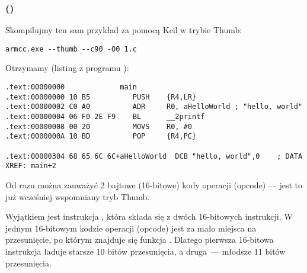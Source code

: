 \subsubsection{\NonOptimizingKeilVI (\ThumbMode)}

Skompilujmy ten sam przykład za pomocą Keil w trybie
 Thumb:

\begin{lstlisting}
armcc.exe --thumb --c90 -O0 1.c 
\end{lstlisting}

Otrzymamy (listing z programu \IDA):

\begin{lstlisting}[caption=\NonOptimizingKeilVI (\ThumbMode) + \IDA,style=customasmARM]
.text:00000000             main
.text:00000000 10 B5          PUSH    {R4,LR}
.text:00000002 C0 A0          ADR     R0, aHelloWorld ; "hello, world"
.text:00000004 06 F0 2E F9    BL      __2printf
.text:00000008 00 20          MOVS    R0, #0
.text:0000000A 10 BD          POP     {R4,PC}

.text:00000304 68 65 6C 6C+aHelloWorld  DCB "hello, world",0    ; DATA XREF: main+2
\end{lstlisting}

Od razu można zauważyć 2 bajtowe (16-bitowe) kody operacji (opcode) --- jest to już wcześniej wspomniany tryb Thumb.

Wyjątkiem jest instrukcja , która składa się z dwóch 16-bitowych instrukcji.
W jednym 16-bitowym kodzie operacji (opcode) jest za mało miejsca na przesunięcie, po którym znajduje się funkcja \printf.
Dlatego pierwsza 16-bitowa instrukcja ładuje starsze 10 bitów przesunięcia, a druga~--- młodsze 11 bitów przesunięcia.


